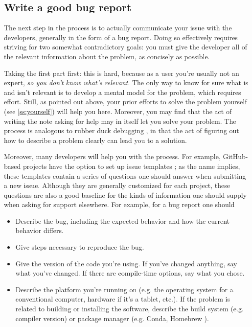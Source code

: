 \documentclass[9pt,training]{livecoms}
\begin{document}
\subsection{Write a good bug report}

The next step in the process is to actually communicate your issue with the
developers, generally in the form of a bug report.  Doing so effectively
requires striving for two somewhat contradictory goals: you must give the
developer all of the relevant information about the problem, as concisely as
possible.

Taking the first part first: this is hard, because as a user you're usually not
an expert, \emph{so you don't know what's relevant}. The only way to know for
sure what is and isn't relevant is to develop a mental model for the problem,
which requires effort. Still, as pointed out above, your prior efforts to solve
the problem yourself (see \ref{ss:yourself}) will help you here.  Moreover, you
may find that the act of writing the note asking for help may in itself let you
solve your problem. The process is analogous to rubber duck debugging
\cite{Thomas-1999}, in that the act of figuring out how to describe a problem
clearly can lead you to a solution.

Moreover, many developers will help you with the process. For example,
GitHub-based projects have the option to set up issue templates
\cite{github-templates}; as the name implies, these templates contain a series
of questions one should answer when submitting a new issue. Although they are
generally customized for each project, these questions are also a good baseline
for the kinds of information one should supply when asking for support
elsewhere. For example, for a bug report one should

\begin{itemize}

    \item Describe the bug, including the expected behavior and how the current
    behavior differs.

    \item Give steps necessary to reproduce the bug.

    \item Give the version of the code you're using. If you've changed anything,
    say what you've changed. If there are compile-time options, say what you
    chose.

    \item Describe the platform you're running on (e.g. the operating system for
    a conventional computer, hardware if it's a tablet, etc.). If the problem is
    related to building or installing the software, describe the build system
    (e.g. compiler version) or package manager (e.g. Conda\cite{CONDA}, Homebrew \cite{HOMEBREW}).

\end{itemize}
\end{document}
